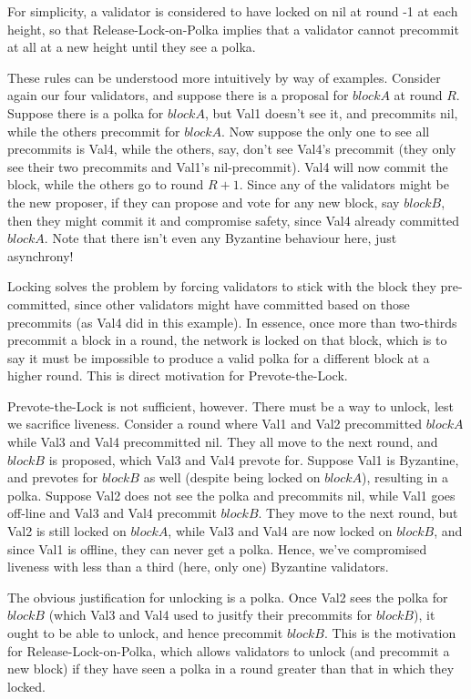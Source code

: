 For simplicity, a validator is considered to have locked on nil at round -1 at each height, so that Release-Lock-on-Polka implies that a validator cannot precommit at all at a new height until they see a polka.

These rules can be understood more intuitively by way of examples. 
Consider again our four validators, and suppose there is a proposal for $blockA$ at round $R$. 
Suppose there is a polka for $blockA$, but Val1 doesn't see it, and precommits nil, while the others precommit for $blockA$.
Now suppose the only one to see all precommits is Val4, while the others, say, don't see Val4's precommit (they only see their two precommits and Val1's nil-precommit).
Val4 will now commit the block, while the others go to round $R+1$.
Since any of the validators might be the new proposer, if they can propose and vote for any new block, say $blockB$, then they might commit it and compromise safety, since Val4 already committed $blockA$.
Note that there isn't even any Byzantine behaviour here, just asynchrony!

Locking solves the problem by forcing validators to stick with the block they pre-committed, since other validators might have committed based on those precommits (as Val4 did in this example).
In essence, once more than two-thirds precommit a block in a round, the network is locked on that block,
which is to say it must be impossible to produce a valid polka for a different block at a higher round.
This is direct motivation for Prevote-the-Lock.

Prevote-the-Lock is not sufficient, however. There must be a way to unlock, lest we sacrifice liveness.
Consider a round where Val1 and Val2 precommitted $blockA$ while Val3 and Val4 precommitted nil.
They all move to the next round, and $blockB$ is proposed, which Val3 and Val4 prevote for.
Suppose Val1 is Byzantine, and prevotes for $blockB$ as well (despite being locked on $blockA$), resulting in a polka.
Suppose Val2 does not see the polka and precommits nil, while Val1 goes off-line and Val3 and Val4 precommit $blockB$. 
They move to the next round, but Val2 is still locked on $blockA$, while Val3 and Val4 are now locked on $blockB$, 
and since Val1 is offline, they can never get a polka. Hence, we've compromised liveness with less than a third (here, only one) Byzantine validators.

The obvious justification for unlocking is a polka. Once Val2 sees the polka for $blockB$ (which Val3 and Val4 used to jusitfy their precommits for $blockB$), 
it ought to be able to unlock, and hence precommit $blockB$.
This is the motivation for Release-Lock-on-Polka, which allows validators to unlock (and precommit a new block) if they have seen a polka in a round greater than that in which they locked.

